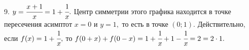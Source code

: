 9. $y=\cfrac{x+1}{x}=1+\cfrac{1}{x}.$ Центр симметрии этого графика находится в точке пересечения асимптот $x=0$ и $y=1,$ то есть в точке $(0;1).$ Действительно, если $f(x)=1+\cfrac{1}{x},$ то $f(0+x)+f(0-x)=1+\cfrac{1}{x}+1-\cfrac{1}{x}=2=2\cdot1.$\\
